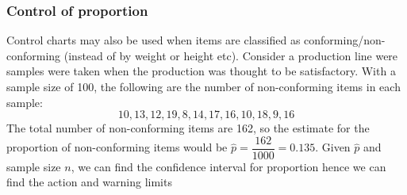     \newpage
    \subsubsection{Control of proportion}
        Control charts may also be used when items are classified as conforming/non-conforming (instead of by weight or height etc). Consider a production line were samples were taken when the production was thought to be satisfactory. With a sample size of 100, the following are the number of non-conforming items in each sample:
        $$
        10, 13, 12, 19, 8, 14, 17, 16, 10, 18, 9, 16
        $$
        The total number of non-conforming items are 162, so the estimate for the proportion of non-conforming items would be $\hat{p} = \dfrac{162}{1000} = 0.135$. Given $\hat{p}$ and sample size $n$, we can find the confidence interval for proportion hence we can find the action and warning limits

